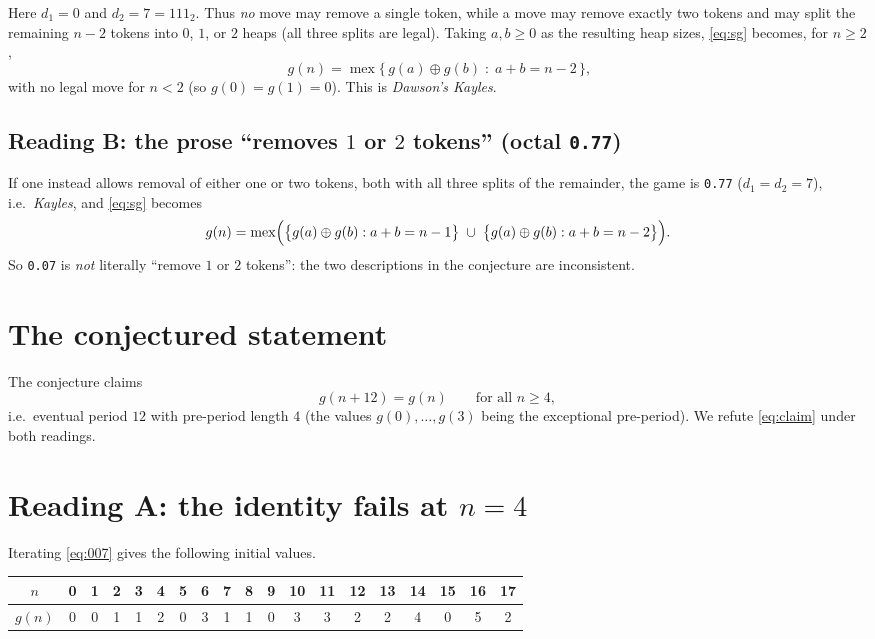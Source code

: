 \documentclass[11pt]{article}
\newcommand{\mex}{\operatorname{mex}}
\newcommand{\Sg}{g}
\begin{document}
Here $d_1=0$ and $d_2=7=111_2$. Thus \emph{no} move may remove a single
token, while a move may remove exactly two tokens and may split the
remaining $n-2$ tokens into $0$, $1$, or $2$ heaps (all three splits are
legal). Taking $a,b\ge 0$ as the resulting heap sizes, \eqref{eq:sg}
becomes, for $n\ge 2$,
\begin{equation}\label{eq:007}
  \boxed{\;\Sg(n)=\mex\bigl\{\,\Sg(a)\oplus\Sg(b)\;:\;a+b=n-2\,\bigr\},}
\end{equation}
with no legal move for $n<2$ (so $\Sg(0)=\Sg(1)=0$). This is
\emph{Dawson's Kayles}.

\subsection{Reading B: the prose ``removes $1$ or $2$ tokens'' (octal \texttt{0.77})}

If one instead allows removal of either one or two tokens, both with all
three splits of the remainder, the game is \texttt{0.77}
($d_1=d_2=7$), i.e.\ \emph{Kayles}, and \eqref{eq:sg} becomes
\begin{equation}\label{eq:077}
  \Sg(n)=\mex\Bigl(
    \bigl\{\Sg(a)\oplus\Sg(b):a+b=n-1\bigr\}
    \;\cup\;
    \bigl\{\Sg(a)\oplus\Sg(b):a+b=n-2\bigr\}
  \Bigr).
\end{equation}
So \texttt{0.07} is \emph{not} literally ``remove $1$ or $2$ tokens'':
the two descriptions in the conjecture are inconsistent.

\section{The conjectured statement}

The conjecture claims
\begin{equation}\label{eq:claim}
  \Sg(n+12)=\Sg(n)\qquad\text{for all }n\ge 4,
\end{equation}
i.e.\ eventual period $12$ with pre-period length $4$ (the values
$\Sg(0),\dots,\Sg(3)$ being the exceptional pre-period). We refute
\eqref{eq:claim} under both readings.

\section{Reading A: the identity fails at $n=4$}

Iterating \eqref{eq:007} gives the following initial values.

\begin{center}
\begin{tabular}{c|cccccccccccccccccc}
$n$      & 0&1&2&3&4&5&6&7&8&9&10&11&12&13&14&15&16&17\\
\hline
$\Sg(n)$ & 0&0&1&1&2&0&3&1&1&0&3&3&2&2&4&0&5&2
\end{tabular}
\end{center}
\end{document}

